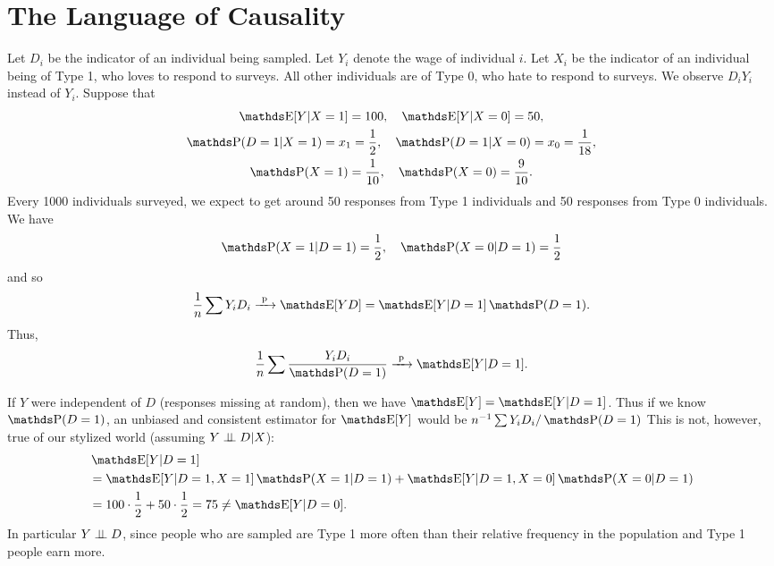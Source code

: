 \documentclass[letterpaper, 10pt]{article}
\begin{document}
\section{The Language of Causality}
\begin{example}
  Let \(D_i\) be the indicator of an individual being sampled.
  Let \(Y_i\) denote the wage of individual \(i\).
  Let \(X_i\) be the indicator of an individual being of Type 1, who loves to respond to surveys.
  All other individuals are of Type 0, who hate to respond to surveys.
  We observe \(D_i Y_i\) instead of \(Y_i\). 
  Suppose that
  \begin{gather*}
    \E[Y|X = 1] = 100, \quad
    \E[Y|X = 0] = 50, \\
    \P(D = 1| X = 1) = x_1 = \frac{1}{2}, \quad
    \P(D = 1| X = 0) = x_0 = \frac{1}{18}, \\
    \P(X = 1) = \frac{1}{10}, \quad
    \P(X = 0) = \frac{9}{10}.
  \end{gather*}
  Every 1000 individuals surveyed, we expect to get around 50 responses from Type 1 individuals and 50 responses from Type 0 individuals.
  We have
  \[
    \P(X = 1|D = 1) = \frac{1}{2}, \quad
    \P(X = 0|D = 1) = \frac{1}{2}
  \]
  and so
  \[
    \frac{1}{n} \sum Y_i D_i
    \longprobto \E[YD]
    = \E[Y|D = 1] \P(D = 1).
  \]
  Thus,
  \[
    \frac{1}{n} \sum \frac{Y_i D_i}{\P(D = 1)} \longprobto \E[Y|D = 1].
  \]

  If \(Y\) were independent of \(D\) (responses missing at random), then we have \(\E[Y] = \E[Y|D = 1]\).
  Thus if we know \(\P(D = 1)\), an unbiased and consistent estimator for \(\E[Y]\) would be \(n^{-1} \sum Y_i D_i / \P(D = 1)\)
  This is not, however, true of our stylized world (assuming \(Y \perp \!\!\! \perp D | X\)):
  \begin{align*}
    &\E[Y|D = 1] \\
    &= \E[Y|D = 1, X = 1]\P(X = 1|D = 1) + \E[Y|D = 1, X = 0]\P(X = 0|D = 1) \\
    &= 100 \cdot \frac{1}{2} + 50 \cdot \frac{1}{2}
    = 75 \neq \E[Y|D = 0].
  \end{align*}
  In particular \(Y \perp \!\!\! \perp D\), since people who are sampled are Type 1 more often than their relative frequency in the population and Type 1 people earn more.


\end{example}
\end{document}
